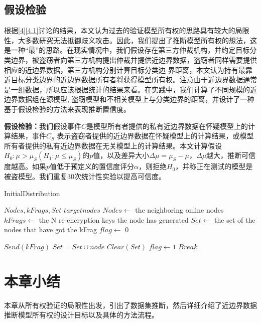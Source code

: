 \subsection{假设检验}

根据\ref{4}\ref{4.1}讨论的结果，本文认为过去的验证模型所有权的思路具有较大的局限性，大多数研究无法抵御歧义攻击。因此，我们提出了推断模型所有权的想法，这是一种“最”的思路。在现实情况中，我们假设存在第三方仲裁机构，并约定目标分类边界，被盗窃者向第三方机构提出仲裁并提供近边界数据，盗窃者同样需要提供相应的近边界数据，第三方机构分别计算目标分类边
界距离，本文认为持有最靠近目标分类边界的近边界数据所有者将获得模型所有权。注意由于近边界数据通常是一组数据，所以应该根据统计的结果来看。在实践中，我们计算了不同规模的近边界数据组在源模型, 盗窃模型和不相关模型上与分类边界的距离，并设计了一种基于假设检验的方法来表现推断置信度。

\noindent\textbf{假设检验：}我们假设事件$C$是模型所有者提供的私有近边界数据在怀疑模型上的计算结果，事件$C_S$ 表示盗窃者提供的近边界数据在怀疑模型上的计算结果，或模型所有者提供的私有近边界数据在无关模型上的计算结果。本文计算假设$H_0:\mu > \mu_S(H_1:\mu\leq\mu_S)$的$p$值，以及差异大小$\Delta \mu = \mu_S - \mu$，$\Delta\mu$越大，推断可信度越高。如果$p$值低于预定义的置信度评分$\alpha$，则拒绝$H_0$，并称正在测试的模型是被盗模型。我们重复30次统计性实验以提高可信度。


\begin{algorithm}[htbp]
	\caption{InitialDistribution}
	\label{alg:1}
	\begin{algorithmic}[1]
		
		\Require $Nodes,kFrags,Set$
		\Ensure $targetnodes$
		\State $Nodes \gets$ the neighboring online nodes
		\State $kFrags \gets$ the N re-encryption keys the node has generated
		\State $Set \gets$ the set of the nodes that have got the kFrag
		\State $flag \gets$ 0
		\State
		\State {}
		\EndIf
		\State {}
		\EndIf
		\EndFor
		
		
		\State    
		\State $Send(kFrag)$
		\State $Set=Set \cup node$
		\State $Clear(Set)$
		\EndIf
		\State $flag \gets 1$
		\State $Break$
		
		
		\EndIf
		\EndFor
		\EndFunction
		
		
	\end{algorithmic}
\end{algorithm}

\section{本章小结}

本章从所有权验证的局限性出发，引出了数据集推断，然后详细介绍了近边界数据推断模型所有权的设计目标以及具体的方法流程。

